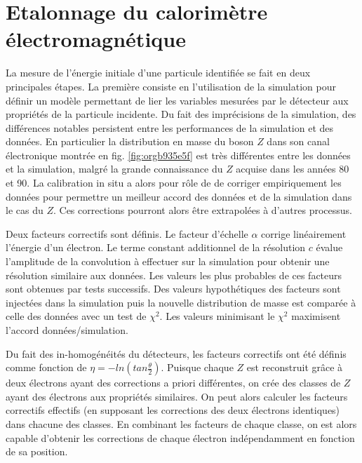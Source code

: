 \section{Etalonnage du calorimètre électromagnétique}

La mesure de l'énergie initiale d'une particule identifiée se fait en deux principales étapes.
La première consiste en l'utilisation de la simulation pour définir un modèle permettant de lier les variables mesurées par le détecteur aux propriétés de la particule incidente.
Du fait des imprécisions de la simulation, des différences notables persistent entre les performances de la simulation et des données.
En particulier la distribution en masse du boson $Z$ dans son canal électronique montrée en fig. \ref{fig:orgb935e5f} est très différentes entre les données et la simulation, malgré la grande connaissance du $Z$ acquise dans les années 80 et 90.
La calibration in situ a alors pour rôle de de corriger empiriquement les données pour permettre un meilleur accord des données et de la simulation dans le cas du $Z$.
Ces corrections pourront alors être extrapolées à d'autres processus.

Deux facteurs correctifs sont définis.
Le facteur d'échelle $\alpha$ corrige linéairement l'énergie d'un électron.
Le terme constant additionnel de la résolution $c$ évalue l'amplitude de la convolution à effectuer sur la simulation pour obtenir une résolution similaire aux données.
Les valeurs les plus probables de ces facteurs sont obtenues par tests successifs.
Des valeurs hypothétiques des facteurs sont injectées dans la simulation puis la nouvelle distribution de masse est comparée à celle des données avec un test de $\chi^2$.
Les valeurs minimisant le $\chi^2$ maximisent l'accord données/simulation.

Du fait des in-homogénéités du détecteurs, les facteurs correctifs ont été définis comme fonction de $\eta=-ln(tan\frac{\theta}{2})$.
Puisque chaque $Z$ est reconstruit grâce à deux électrons ayant des corrections a priori différentes, on crée des classes de $Z$ ayant des électrons aux propriétés similaires.
On peut alors calculer les facteurs correctifs effectifs (en supposant les corrections des deux électrons identiques) dans chacune des classes.
En combinant les facteurs de chaque classe, on est alors capable d'obtenir les corrections de chaque électron indépendamment en fonction de sa position.

